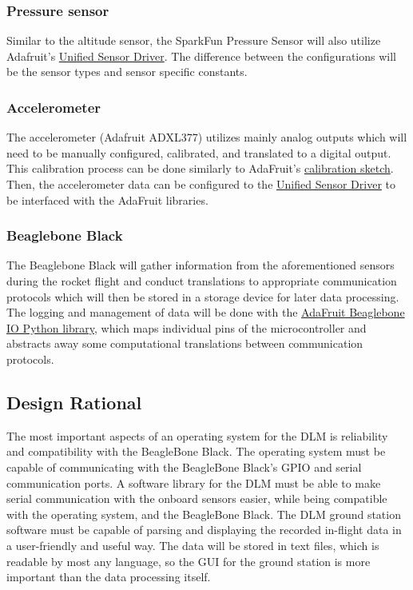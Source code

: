\documentclass[onecolumn, draftclsnofoot,10pt, compsoc]{IEEEtran}
\begin{document}
\subsubsection{Pressure sensor}
Similar to the altitude sensor, the SparkFun Pressure Sensor will also utilize Adafruit's \href{https://github.com/adafruit/Adafruit_Sensor}{Unified Sensor Driver}. The difference between the configurations will be the sensor types and sensor specific constants.
\subsubsection{Accelerometer}
The accelerometer (Adafruit ADXL377) utilizes mainly analog outputs which will need to be manually configured, calibrated, and translated to a digital output. This calibration process can be done similarly to AdaFruit's \href{https://learn.adafruit.com/adafruit-analog-accelerometer-breakouts/programming}{calibration sketch}. Then, the accelerometer data can be configured to the \href{https://github.com/adafruit/Adafruit_Sensor}{Unified Sensor Driver} to be interfaced with the AdaFruit libraries.
\subsubsection{Beaglebone Black}
The Beaglebone Black will gather information from the aforementioned sensors during the rocket flight and conduct translations to appropriate communication protocols which will then be stored in a storage device for later data processing. The logging and management of data will be done with the \href{https://github.com/adafruit/adafruit-beaglebone-io-python}{AdaFruit Beaglebone IO Python library}, which maps individual pins of the microcontroller and abstracts away some computational translations between communication protocols.

\subsection{Design Rational}
The most important aspects of an operating system for the DLM is reliability and compatibility with the BeagleBone Black. The operating system must be capable of communicating with the BeagleBone Black's GPIO and serial communication ports. A software library for the DLM must be able to make serial communication with the onboard sensors easier, while being compatible with the operating system, and the BeagleBone Black. The DLM ground station software must be capable of parsing and displaying the recorded in-flight data in a user-friendly and useful way. The data will be stored in text files, which is readable by most any language, so the GUI for the ground station is more important than the data processing itself.
\end{document}
